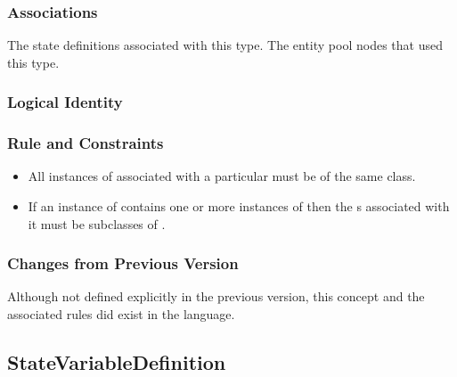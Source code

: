 \subsubsection{Associations}

\begin{attributes}
   The state
  definitions associated with this type.
 The entity pool nodes that
used this type.
\end{attributes}

\subsubsection{Logical Identity}

\begin{logicalkey}
  \item {}
  \item {}
\end{logicalkey}

\subsubsection{Rule and Constraints}

\begin{itemize}
\item All instances of  associated with a
  particular  must be of the same class.
\item If an instance of  contains one or more
  instances of  then the
  s associated with it must be subclasses of
  .
\end{itemize}

\subsubsection{Changes from Previous Version}

Although not defined explicitly in the previous version, this concept
and the associated rules did exist in the language.

\subsection{StateVariableDefinition}
\label{defn:StateVariableDefinition}

